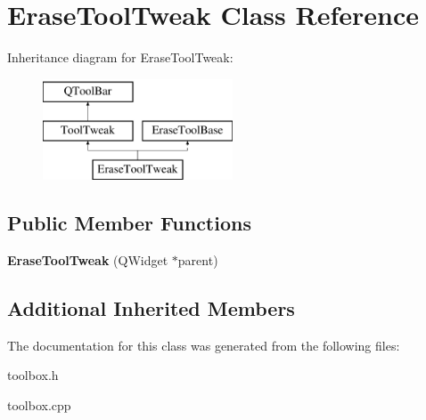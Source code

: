 \hypertarget{class_erase_tool_tweak}{\section{Erase\-Tool\-Tweak Class Reference}
\label{class_erase_tool_tweak}
}
Inheritance diagram for Erase\-Tool\-Tweak\-:\begin{figure}[H]
\begin{center}
\leavevmode
\includegraphics[height=3.000000cm]{class_erase_tool_tweak}
\end{center}
\end{figure}
\subsection*{Public Member Functions}
\begin{DoxyCompactItemize}
\item 
\hypertarget{class_erase_tool_tweak_a1c1c6c445c395c567c39ef36e2449646}{{\bfseries Erase\-Tool\-Tweak} (Q\-Widget $\ast$parent)}\label{class_erase_tool_tweak_a1c1c6c445c395c567c39ef36e2449646}

\end{DoxyCompactItemize}
\subsection*{Additional Inherited Members}


The documentation for this class was generated from the following files\-:\begin{DoxyCompactItemize}
\item 
toolbox.\-h\item 
toolbox.\-cpp\end{DoxyCompactItemize}

